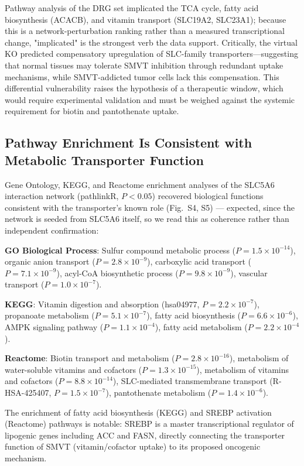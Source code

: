 \documentclass[pdflatex,sn-nature]{sn-jnl}
\begin{document}
Pathway analysis of the DRG set implicated the TCA cycle, fatty acid biosynthesis (ACACB), and vitamin transport (SLC19A2, SLC23A1); because this is a network-perturbation ranking rather than a measured transcriptional change, "implicated" is the strongest verb the data support. Critically, the virtual KO predicted compensatory upregulation of SLC-family transporters---suggesting that normal tissues may tolerate SMVT inhibition through redundant uptake mechanisms, while SMVT-addicted tumor cells lack this compensation. This differential vulnerability raises the hypothesis of a therapeutic window, which would require experimental validation and must be weighed against the systemic requirement for biotin and pantothenate uptake.

\subsection*{Pathway Enrichment Is Consistent with Metabolic Transporter Function}

Gene Ontology, KEGG, and Reactome enrichment analyses of the SLC5A6 interaction network (pathlinkR, $P < 0.05$) recovered biological functions consistent with the transporter's known role (Fig.~S4, S5) --- expected, since the network is seeded from SLC5A6 itself, so we read this as coherence rather than independent confirmation:

\noindent\textbf{GO Biological Process}: Sulfur compound metabolic process ($P=1.5\times10^{-14}$), organic anion transport ($P=2.8\times10^{-9}$), carboxylic acid transport ($P=7.1\times10^{-9}$), acyl-CoA biosynthetic process ($P=9.8\times10^{-9}$), vascular transport ($P=1.0\times10^{-7}$).

\noindent\textbf{KEGG}: Vitamin digestion and absorption (hsa04977, $P=2.2\times10^{-7}$), propanoate metabolism ($P=5.1\times10^{-7}$), fatty acid biosynthesis ($P=6.6\times10^{-6}$), AMPK signaling pathway ($P=1.1\times10^{-4}$), fatty acid metabolism ($P=2.2\times10^{-4}$).

\noindent\textbf{Reactome}: Biotin transport and metabolism ($P=2.8\times10^{-16}$), metabolism of water-soluble vitamins and cofactors ($P=1.3\times10^{-15}$), metabolism of vitamins and cofactors ($P=8.8\times10^{-14}$), SLC-mediated transmembrane transport (R-HSA-425407, $P=1.5\times10^{-7}$), pantothenate metabolism ($P=1.4\times10^{-6}$).

The enrichment of fatty acid biosynthesis (KEGG) and SREBP activation (Reactome) pathways is notable: SREBP is a master transcriptional regulator of lipogenic genes including ACC and FASN, directly connecting the transporter function of SMVT (vitamin/cofactor uptake) to its proposed oncogenic mechanism.
\end{document}
